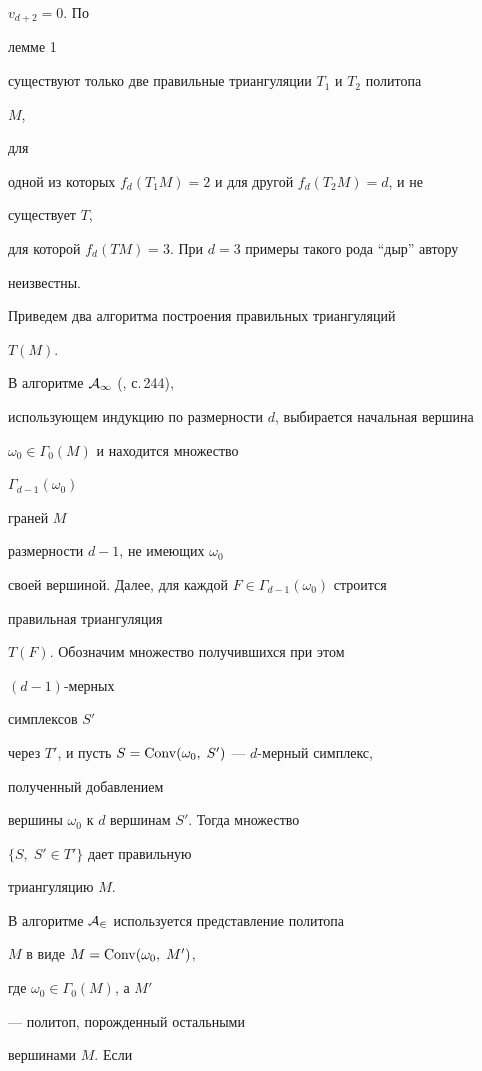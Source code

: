 $v_{d+2}=0$. По


лемме 1


существуют только две правильные триангуляции $T_1$ и $T_2$ политопа


$M$,


для


одной из которых $f_d(T_1M)=2$ и для другой $f_d(T_2M)=d$, и не


существует $T$,


для которой $f_d(TM)=3$. При $d=3$ примеры такого рода ``дыр'' автору


неизвестны.





Приведем два алгоритма построения правильных триангуляций


$T(M)$.


В алгоритме $\cal A_1$ (\cite{En}, с.\,244),


использующем индукцию по размерности $d$, выбирается начальная вершина


$\omega_0\in\Gamma_0(M)$ и находится множество


$\Gamma_{d-1}(\omega_0)$


граней $M$


размерности $d-1$, не имеющих $\omega_0$


своей вершиной. Далее, для каждой $F\in\Gamma_{d-1}(\omega_0)$ строится


правильная триангуляция


$T(F)$. Обозначим множество получившихся при этом


$(d-1)$-мерных


симплексов $S'$


через $T'$, и пусть $S=\operatorname{Conv}(\omega_0,\;S')$ --- $d$-мерный симплекс,


полученный добавлением


вершины $\omega_0$ к $d$ вершинам $S'$. Тогда множество


$\{S,\;S'\in T'\}$ дает правильную


триангуляцию $M$.





В алгоритме $\cal A_2$ используется представление политопа


$M$ в виде $M=\operatorname{Conv}(\omega_0,\;M')$,


где $\omega_0\in\Gamma_0(M)$, а $M'$


--- политоп, порожденный остальными


вершинами $M$. Если


